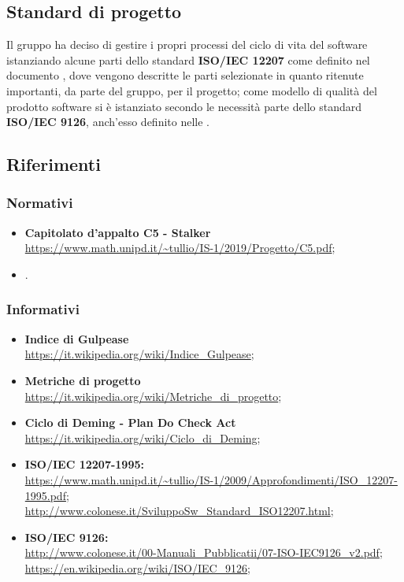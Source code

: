 \subsection{Standard di progetto}
Il gruppo \Gruppo{} ha deciso di gestire i propri processi del ciclo di vita del software istanziando alcune parti dello standard \textbf{ISO/IEC 12207} come definito nel documento \NdP{}, dove vengono descritte le parti selezionate in quanto ritenute importanti, da parte del gruppo, per il progetto; 
come modello di qualità del prodotto software si è istanziato secondo le necessità parte dello standard \textbf{ISO/IEC 9126}, anch'esso definito nelle \NdP{}.

\subsection{Riferimenti}

\subsubsection{Normativi}
\begin{itemize}
    \item \textbf{Capitolato d'appalto C5 - Stalker}\\     
    \url{https://www.math.unipd.it/~tullio/IS-1/2019/Progetto/C5.pdf};
    \item {}.
\end{itemize}

\subsubsection{Informativi}
\begin{itemize}
    \item \textbf{Indice di Gulpease}\\
    \url{https://it.wikipedia.org/wiki/Indice_Gulpease};
    \item \textbf{Metriche di progetto}\\
    \url{https://it.wikipedia.org/wiki/Metriche_di_progetto};
    \item \textbf{Ciclo di Deming - Plan Do Check Act}\\
    \url{https://it.wikipedia.org/wiki/Ciclo_di_Deming};
    \item \textbf{ISO/IEC 12207-1995:}\\     
    \url{https://www.math.unipd.it/~tullio/IS-1/2009/Approfondimenti/ISO_12207-1995.pdf};\\
    \url{http://www.colonese.it/SviluppoSw_Standard_ISO12207.html};
    \item \textbf{ISO/IEC 9126:}\\
    \url{http://www.colonese.it/00-Manuali_Pubblicatii/07-ISO-IEC9126_v2.pdf};\\
    \url{https://en.wikipedia.org/wiki/ISO/IEC_9126};
\end{itemize}